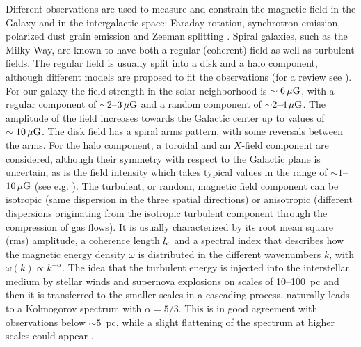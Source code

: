 \documentclass[twoside,12pt]{article}
\begin{document}
Different observations are used to measure and constrain the magnetic field in the Galaxy and in the intergalactic space: Faraday rotation, synchrotron emission, polarized dust grain emission and Zeeman splitting \cite{beck16}. Spiral galaxies, such as the Milky Way, are known to have both a regular (coherent) field as well as turbulent fields.  The regular field is usually split into a disk and a halo component, although different models are proposed to fit the observations (for a review see \cite{haverkorn15}). For our galaxy the field strength in the solar neighborhood is $\sim 6\,\mu{\rm G}$, with a regular component of $\sim 2$--$3\, \mu{\rm G}$ and a random component of $\sim 2$--$4\, \mu{\rm G}$. The amplitude of the field increases towards the Galactic center up to values of $\sim 10\,\mu{\rm G}$. The disk field has a spiral arms pattern, with some reversals between the arms. For the halo component, a toroidal and an $X$-field component are considered, although their symmetry with respect to the Galactic plane is uncertain, as is the field intensity  which takes typical values in the range of $\sim 1$--$10\,\mu{\rm G}$ (see e.g. \cite{tf17}). 
The turbulent, or random, magnetic field component can be isotropic (same dispersion in the three spatial directions) or anisotropic (different dispersions originating from the isotropic turbulent component through the compression of gas flows). It is usually characterized by its root mean square (rms) amplitude, a coherence length $l_{\rm c}$ and a spectral index that describes how the magnetic energy density $\omega$ is distributed in the different wavenumbers $k$, with $\omega(k)\propto k^{-\alpha}$. The idea that the turbulent energy is injected into the interstellar medium by stellar winds and supernova explosions on scales of 10--100~pc and then it is transferred to the smaller scales in a cascading process, naturally leads to a Kolmogorov spectrum with $\alpha=5/3$.
This is in good agreement with observations below $\sim 5$~pc, while a slight flattening of the spectrum at higher scales could appear \cite{ms96,han04}. 
\end{document}
